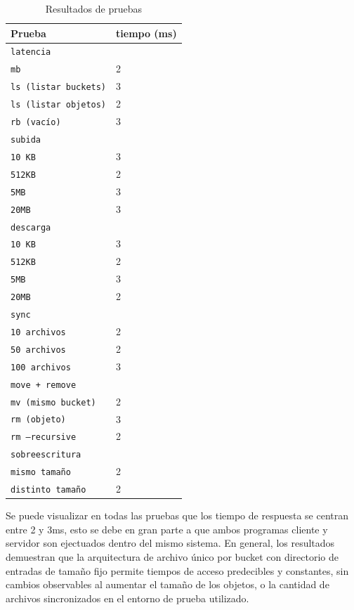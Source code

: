\documentclass[12pt, letterpaper]{article}
\begin{document}
\begin{table}[h]
\caption{Resultados de pruebas}
\label{tab:resultados}
\centering
\begin{tabular}{p{10cm}p{3cm}}
\toprule
\textbf{Prueba} & \textbf{tiempo (ms)} \\
\midrule
\texttt{latencia}            & \\
\texttt{mb}                  & 2 \\
\texttt{ls (listar buckets)} & 3 \\
\texttt{ls (listar objetos)} & 2 \\
\texttt{rb (vacío)}          & 3 \\
\midrule
\texttt{subida}             & \\
\texttt{10 KB}              & 3 \\
\texttt{512KB}              & 2 \\
\texttt{5MB}                & 3 \\
\texttt{20MB}               & 3 \\
\midrule
\texttt{descarga}           & \\
\texttt{10 KB}              & 3 \\
\texttt{512KB}              & 2 \\
\texttt{5MB}                & 3 \\
\texttt{20MB}               & 2 \\
\midrule
\texttt{sync}               & \\
\texttt{10 archivos}        & 2 \\
\texttt{50 archivos}        & 2 \\
\texttt{100 archivos}       & 3 \\
\midrule
\texttt{move + remove}      & \\
\texttt{mv (mismo bucket)}  & 2 \\
\texttt{rm (objeto)}        & 3 \\
\texttt{rm --recursive}     & 2 \\
\midrule
\texttt{sobreescritura}     & \\
\texttt{mismo tamaño}       & 2 \\
\texttt{distinto tamaño}    & 2 \\
\bottomrule
\end{tabular}
\end{table}

Se puede visualizar en todas las pruebas que los tiempo de respuesta se centran entre 2 y 3ms, esto se debe en gran parte a que ambos programas cliente y servidor son ejectuados dentro del mismo sistema. En general, los resultados demuestran que la arquitectura de archivo único por bucket con directorio de entradas de tamaño fijo permite tiempos de acceso predecibles y constantes, sin cambios observables al aumentar el tamaño de los objetos, o la cantidad de archivos sincronizados en el entorno de prueba utilizado.
\end{document}
